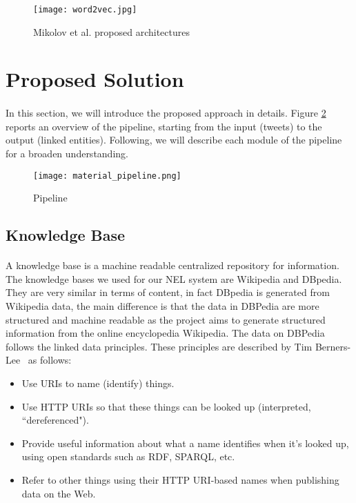 \vspace{-5pt}
\begin{figure}[h!]
\texttt{[image: word2vec.jpg]}
\caption{Mikolov et al. proposed architectures}
\label{fig:w2v}
\end{figure}
\vspace{-15pt}

\section{Proposed Solution}
\paragraph{}In this section, we will introduce the proposed approach in details. Figure \ref{fig:pipeline} reports an overview of the pipeline, starting from the input (tweets) to the output (linked entities). Following, we will describe each module of the pipeline for a broaden understanding.

\vspace{-10pt}
\begin{figure}[h!]
\texttt{[image: material\_pipeline.png]}  
\caption{Pipeline}
\label{fig:pipeline}
\end{figure}
\vspace{-10pt}

\subsection{Knowledge Base}
\paragraph{}
A knowledge base is a machine readable centralized repository for information. The knowledge bases we used for our NEL system are Wikipedia and DBpedia. They are very similar in terms of content, in fact DBpedia is generated from Wikipedia data, the main difference is that the data in DBPedia are more structured and machine readable as the project aims to generate structured information from the online encyclopedia Wikipedia. The data on DBPedia follows the linked data principles. These principles are described by Tim Berners-Lee~\cite{timbernerslee2006linkeddata} as follows:

\begin{itemize}[itemsep = 0.1em]
\item Use URIs to name (identify) things.
\item Use HTTP URIs so that these things can be looked up (interpreted, ``dereferenced").
\item Provide useful information about what a name identifies when it's looked up, using open standards such as RDF, SPARQL, etc.
\item Refer to other things using their HTTP URI-based names when publishing data on the Web.
\end{itemize}

